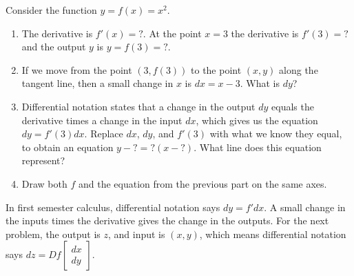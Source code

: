 \begin{problem}
 Consider the function $y=f(x)=x^2$.  
\begin{enumerate}
 \item The derivative is $f'(x) = ?$. At the point $x=3$ the derivative is $f'(3)=?$ and the output $y$ is $y=f(3)=?$.
 \item If we move from the point $(3,f(3))$ to the point $(x,y)$ along the tangent line, then a small change in $x$ is $dx=x-3$. What is $dy$?
 \item Differential notation states that a change in the output $dy$ equals the derivative times a change in the input $dx$, which gives us the equation $dy=f'(3)dx$. Replace $dx$, $dy$, and $f'(3)$ with what we know they equal, to obtain an equation $y-?=?(x-?)$. What line does this equation represent?
 \item Draw both $f$ and the equation from the previous part on the same axes.
\end{enumerate}
\end{problem}

 In first semester calculus, differential notation says $dy=f' dx$. A small change in the inputs times the derivative gives the change in the outputs.  For the next problem, the output is $z$, and input is $(x,y)$, which means differential notation says $dz = Df \begin{bmatrix}dx\\dy\end{bmatrix}$.

